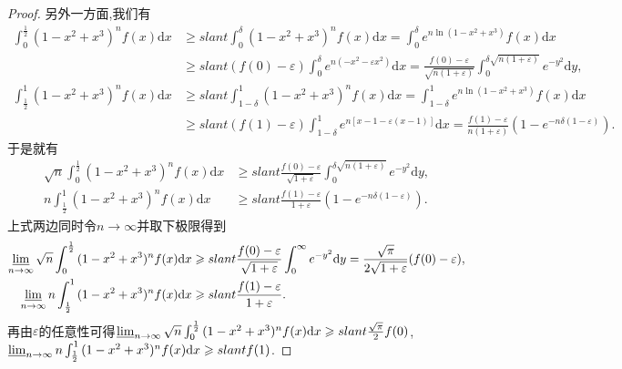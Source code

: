 \documentclass[../../main.tex]{subfiles}
\begin{document}
\begin{proof}
另外一方面,我们有
\begin{align*}
\int_0^{\frac{1}{2}}{(1 - x^2 + x^3)^nf(x)\mathrm{d}x}&\geqslant slant \int_0^{\delta}{(1 - x^2 + x^3)^nf(x)\mathrm{d}x}=\int_0^{\delta}{e^{n\ln(1 - x^2 + x^3)}f(x)\mathrm{d}x}\\
&\geqslant slant (f(0) - \varepsilon)\int_0^{\delta}{e^{n(-x^2 - \varepsilon x^2)}\mathrm{d}x}=\frac{f(0) - \varepsilon}{\sqrt{n(1 + \varepsilon)}}\int_0^{\delta\sqrt{n(1 + \varepsilon)}}{e^{-y^2}\mathrm{d}y},
\end{align*}
\begin{align*}
\int_{\frac{1}{2}}^1{(1 - x^2 + x^3)^nf(x)\mathrm{d}x}&\geqslant slant \int_{1 - \delta}^1{(1 - x^2 + x^3)^nf(x)\mathrm{d}x}=\int_{1 - \delta}^1{e^{n\ln(1 - x^2 + x^3)}f(x)\mathrm{d}x}\\
&\geqslant slant (f(1) - \varepsilon)\int_{1 - \delta}^1{e^{n[x - 1 - \varepsilon(x - 1)]}\mathrm{d}x}=\frac{f(1) - \varepsilon}{n(1 + \varepsilon)}\left(1 - e^{-n\delta(1 - \varepsilon)}\right).
\end{align*}
于是就有
\begin{align*}
\sqrt{n}\int_0^{\frac{1}{2}}{(1 - x^2 + x^3)^nf(x)\mathrm{d}x}&\geqslant slant \frac{f(0) - \varepsilon}{\sqrt{1 + \varepsilon}}\int_0^{\delta\sqrt{n(1 + \varepsilon)}}{e^{-y^2}\mathrm{d}y},\\
n\int_{\frac{1}{2}}^1{(1 - x^2 + x^3)^nf(x)\mathrm{d}x}&\geqslant slant \frac{f(1) - \varepsilon}{1 + \varepsilon}\left(1 - e^{-n\delta(1 - \varepsilon)}\right).
\end{align*}
上式两边同时令\(n\rightarrow\infty\)并取下极限得到
\begin{align*}
\varliminf_{n\rightarrow\infty}\sqrt{n}\int_0^{\frac{1}{2}}{(1 - x^2 + x^3)^nf(x)\mathrm{d}x}&\geqslant slant \frac{f(0) - \varepsilon}{\sqrt{1 + \varepsilon}}\int_0^{\infty}{e^{-y^2}\mathrm{d}y}=\frac{\sqrt{\pi}}{2\sqrt{1 + \varepsilon}}(f(0) - \varepsilon),\\
\varliminf_{n\rightarrow\infty}n\int_{\frac{1}{2}}^1{(1 - x^2 + x^3)^nf(x)\mathrm{d}x}&\geqslant slant \frac{f(1) - \varepsilon}{1 + \varepsilon}.
\end{align*}
再由\(\varepsilon\)的任意性可得\(\varliminf_{n\rightarrow\infty}\sqrt{n}\int_0^{\frac{1}{2}}{(1 - x^2 + x^3)^nf(x)\mathrm{d}x}\geqslant slant \frac{\sqrt{\pi}}{2}f(0)\),\(\varliminf_{n\rightarrow\infty}n\int_{\frac{1}{2}}^1{(1 - x^2 + x^3)^nf(x)\mathrm{d}x}\geqslant slant f(1)\).


\end{proof}
\end{document}
